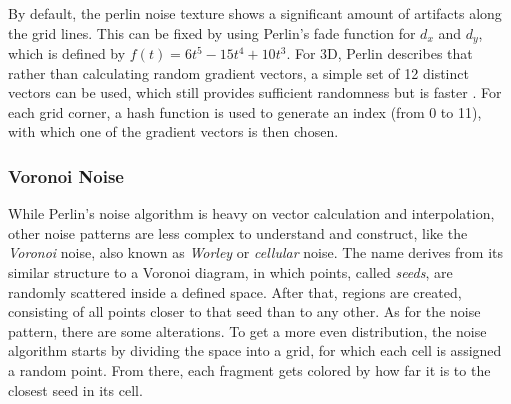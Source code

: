 \noindent
By default, the perlin noise texture shows a significant amount of artifacts along the grid lines. This can be fixed by using Perlin's fade function \cite{online:perlin:impl} for $d_x$ and $d_y$, which is defined by $f(t) = 6t^5-15t^4+10t^3$.
\emptyline
For 3D, Perlin describes that rather than calculating random gradient vectors, a simple set of 12 distinct vectors can be used, which still provides sufficient randomness but is faster \cite{online:perlin:improved}.
For each grid corner, a hash function is used to generate an index (from 0 to 11), with which one of the gradient vectors is then chosen.


\clearpage
\subsubsection{Voronoi Noise}
While Perlin's noise algorithm is heavy on vector calculation and interpolation, other noise patterns are less complex to understand and construct, like the \textit{Voronoi} noise, also known as \textit{Worley} or \textit{cellular} noise.
The name derives from its similar structure to a Voronoi diagram, in which points, called \textit{seeds}, are randomly scattered inside a defined space. After that, regions are created, consisting of all points closer to that seed than to any other.
\emptyline
As for the noise pattern, there are some alterations. To get a more even distribution, the noise algorithm starts by dividing the space into a grid, for which each cell is assigned a random point. From there, each fragment gets colored by how far it is to the closest seed in its cell.


